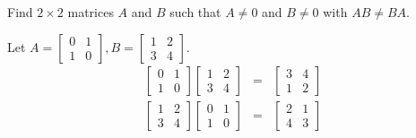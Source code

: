 \documentclass{ximera}
\begin{document}
\begin{problem}\label{prb:4.20} Find $2 \times 2$ matrices $A$ and $B$ such that $A \neq 0$ and $B \neq 0$ with $AB \neq BA$.
\begin{hint}
Let $A = \left[
\begin{array}{cc}
0 & 1 \\
1 & 0
\end{array}
\right] , B = \left[
\begin{array}{cc}
1 & 2 \\
3 & 4
\end{array}
\right] $.
\begin{eqnarray*}
\left[
\begin{array}{cc}
0 & 1 \\
1 & 0
\end{array}
\right]
 \left[
\begin{array}{cc}
1 & 2 \\
3 & 4
\end{array}
\right]  &=&
 \left[
\begin{array}{cc}
3 & 4 \\
1 & 2
\end{array}
\right] \\
\left[
\begin{array}{cc}
1 & 2 \\
3 & 4
\end{array}
\right] \left[
\begin{array}{cc}
0 & 1 \\
1 & 0
\end{array}
\right]
&=& \left[
\begin{array}{cc}
2 & 1 \\
4 & 3
\end{array}
\right]
\end{eqnarray*}
\end{hint}
\end{problem}
\end{document}
